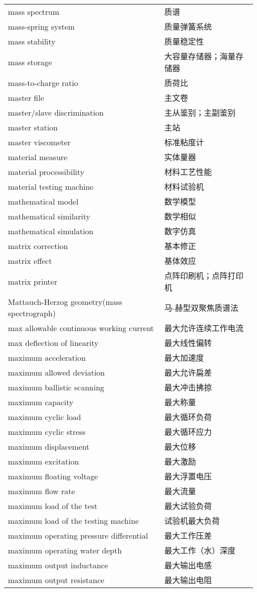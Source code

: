 \documentclass[
]{article}
\begin{document}
\begin{longtable}[]{@{}ll@{}}
mass spectrum & 质谱 \\
mass-spring system & 质量弹簧系统 \\
mass stability & 质量稳定性 \\
mass storage & 大容量存储器；海量存储器 \\
mass-to-charge ratio & 质荷比 \\
master file & 主文卷 \\
master/slave discrimination & 主从鉴别；主副鉴别 \\
master station & 主站 \\
master viscometer & 标准粘度计 \\
material measure & 实体量器 \\
material processibility & 材料工艺性能 \\
material testing machine & 材料试验机 \\
mathematical model & 数学模型 \\
mathematical similarity & 数学相似 \\
mathematical simulation & 数字仿真 \\
matrix correction & 基本修正 \\
matrix effect & 基体效应 \\
matrix printer & 点阵印刷机；点阵打印机 \\
Mattauch-Herzog geometry(mass spectrograph) & 马-赫型双聚焦质谱法 \\
max allowable continuous working current & 最大允许连续工作电流 \\
max deflection of linearity & 最大线性偏转 \\
maximum acceleration & 最大加速度 \\
maximum allowed deviation & 最大允许扁差 \\
maximum ballistic scanning & 最大冲击拂掠 \\
maximum capacity & 最大称量 \\
maximum cyclic load & 最大循环负荷 \\
maximum cyclic stress & 最大循环应力 \\
maximum displacement & 最大位移 \\
maximum excitation & 最大激励 \\
maximum floating voltage & 最大浮置电压 \\
maximum flow rate & 最大流量 \\
maximum load of the test & 最大试验负荷 \\
maximum load of the testing machine & 试验机最大负荷 \\
maximum operating pressure differential & 最大工作压差 \\
maximum operating water depth & 最大工作（水）深度 \\
maximum output inductance & 最大输出电感 \\
maximum output resistance & 最大输出电阻 \\
\bottomrule()
\end{longtable}
\end{document}
